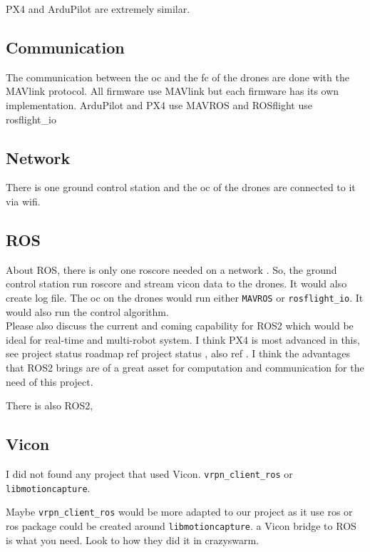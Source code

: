        PX4 and ArduPilot are extremely similar.
        
        \subsection{Communication}
            The communication between the \gls{oc} and the \gls{fc} of the drones are done with the MAVlink protocol. All firmware use MAVlink but each firmware has its own implementation. ArduPilot and PX4 use MAVROS and ROSflight use rosflight\_io 
            
        \subsection{Network}
            There is one ground control station and the \gls{oc} of the drones are connected to it via wifi. 
        
        \subsection{ROS}
            About ROS, there is only one roscore needed on a network \cite{stackoverflow_multi_machine}.
            So, the ground control station run roscore and stream vicon data to the drones. It would also create log file.
            The \gls{oc} on the drones would run either \texttt{MAVROS} or \texttt{rosflight\_io}.
            It would also run the control algorithm.
            {\color{red} \\Please also discuss the current and coming capability for ROS2 which would be ideal for real-time and multi-robot system. I think PX4 is most advanced in this, see project status roadmap ref project status \cite{px4}, also ref \cite{ros_wiki_ng_drones}. I think the advantages that ROS2 brings are of a great asset for computation and communication for the need of this project.\\}
            
            There is also ROS2, 
        
        \subsection{Vicon}
            I did not found any project that used Vicon.
            \texttt{vrpn\_client\_ros} or \texttt{libmotioncapture}.
        
            Maybe \texttt{vrpn\_client\_ros} would be more adapted to our project as it use ros or ros package could be created around \texttt{libmotioncapture}.
            {\color{red}a Vicon bridge to ROS is what you need. Look to how they did it in crazyswarm.}
        
